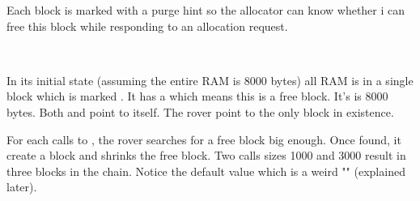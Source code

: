 Each block is marked with a purge hint so the allocator can know whether i can free this block while responding to an allocation request.\\
\par
{}\\
\par
In its initial state (assuming the entire RAM is 8000 bytes) all RAM is in a single block which is marked . It has a   which means this is a free block. It's  is 8000 bytes. Both  and  point to itself. The rover point to the only block in existence.\\
\par
{}
\par
For each calls to , the rover searches for a free block big enough. Once found, it create a block and shrinks the free block. Two calls sizes 1000 and 3000 result in three blocks in the chain. Notice the default  value which is a weird "" (explained later).\\
\par
{}

